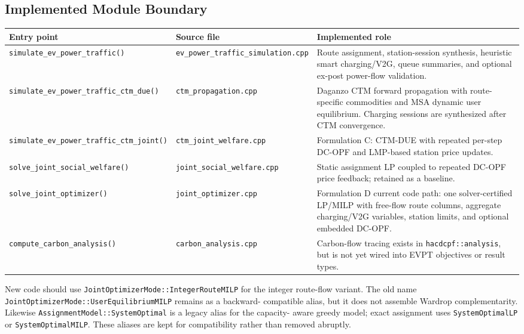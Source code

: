\subsection{Implemented Module Boundary}
\label{sec:evpt-module-structure}

\begin{center}
\small
\begin{tabularx}{\textwidth}{L{0.23\textwidth}L{0.26\textwidth}X}
\toprule
\textbf{Entry point} & \textbf{Source file} & \textbf{Implemented role} \\
\midrule
\texttt{simulate\_ev\_power\_traffic()} &
\texttt{ev\_power\_traffic\_simulation.cpp} &
Route assignment, station-session synthesis, heuristic smart charging/V2G,
queue summaries, and optional ex-post power-flow validation. \\
\texttt{simulate\_ev\_power\_traffic\_ctm\_due()} &
\texttt{ctm\_propagation.cpp} &
Daganzo CTM forward propagation with route-specific commodities and MSA dynamic
user equilibrium. Charging sessions are synthesized after CTM convergence. \\
\texttt{simulate\_ev\_power\_traffic\_ctm\_joint()} &
\texttt{ctm\_joint\_welfare.cpp} &
Formulation C: CTM-DUE with repeated per-step DC-OPF and LMP-based station price
updates. \\
\texttt{solve\_joint\_social\_welfare()} &
\texttt{joint\_social\_welfare.cpp} &
Static assignment LP coupled to repeated DC-OPF price feedback; retained as a
baseline. \\
\texttt{solve\_joint\_optimizer()} &
\texttt{joint\_optimizer.cpp} &
Formulation D current code path: one solver-certified LP/MILP with free-flow
route columns, aggregate charging/V2G variables, station limits, and optional
embedded DC-OPF. \\
\texttt{compute\_carbon\_analysis()} &
\texttt{carbon\_analysis.cpp} &
Carbon-flow tracing exists in \texttt{hacdcpf::analysis}, but is not yet wired
into EVPT objectives or result types. \\
\bottomrule
\end{tabularx}
\end{center}

\begin{remark}
  New code should use \texttt{JointOptimizerMode::IntegerRouteMILP} for the
  integer route-flow variant. The old name
  \texttt{JointOptimizerMode::UserEquilibriumMILP} remains as a backward-
  compatible alias, but it does not assemble Wardrop complementarity. Likewise
  \texttt{AssignmentModel::SystemOptimal} is a legacy alias for the capacity-
  aware greedy model; exact assignment uses \texttt{SystemOptimalLP} or
  \texttt{SystemOptimalMILP}. These aliases are kept for compatibility rather
  than removed abruptly.
\end{remark}

